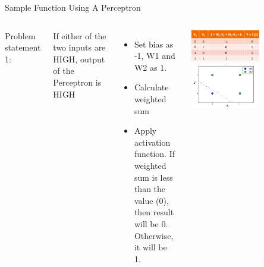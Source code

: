 \documentclass[aspectratio=169,14pt,usenames,dvipsnames]{beamer}
\begin{document}
\begin{frame}{Sample Function Using A Perceptron}
\begin{columns}
\item Problem statement 1: 
\item If either of the two inputs are HIGH, output of the Perceptron is HIGH
\begin{itemize}
  \item Set bias as -1, W1 and W2 as 1.
  \item Calculate weighted sum
  \item Apply activation function. If weighted sum is less than the\\
   value (0), then result will be 0. Otherwise, it will be 1. 
  
\end{itemize}
\includegraphics[width=0.6\textwidth, height=0.3\textheight]{Images/AIML_Percep_IMG9.png}
\includegraphics[width=0.6\textwidth, height=0.3\textheight]{Images/AIML_Percep_IMG10.png}
\end{columns}
\end{frame}
\end{document}
